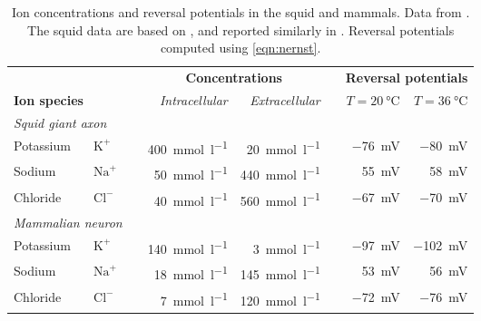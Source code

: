 \begin{table}
	\centering
	\caption[Ion concentrations and reversal potentials in the squid and mammals]{Ion concentrations and reversal potentials in the squid and mammals. Data from \citet[Table~12.1, p.~353]{mccormick2014membrane}. The squid data are based on \citet{hodgkin1949effect}, and reported similarly in \citet[Table~6-1, p.~128]{kandel2012principles}. Reversal potentials computed using \cref{eqn:nernst}.}
	\label{tbl:nernst}
	\small
	\sffamily
	\begin{tabular}{l l p{0.25cm} r r p{0.25cm} r r}
		\toprule
		&
		&
		& \multicolumn{2}{c}{\textbf{Concentrations}}
		&
		& \multicolumn{2}{c}{\textbf{Reversal potentials}} \\ %
		\cmidrule(lr){4-5}\cmidrule(lr){7-8}
		
		\multicolumn{2}{l}{\textbf{Ion species}}
		&
		& \emph{Intracellular}
		& \emph{Extracellular}
		&
		& $T = \SI{20}{\degreeCelsius}$
		& $T = \SI{36}{\degreeCelsius}$ \\ %
		\midrule

		\multicolumn{2}{l}{\emph{Squid giant axon}}\\

		\raggedleft \quad Potassium
		& $\mathrm{K}^+$
		&
		& \SI{400}{\milli\mol\per\litre}
		& \SI{20}{\milli\mol\per\litre}
		&
		& \SI{-76}{\milli\volt}
		& \SI{-80}{\milli\volt} \\

		\raggedleft \quad Sodium
		& $\mathrm{Na}^+$
		&
		& \SI{50}{\milli\mol\per\litre}
		& \SI{440}{\milli\mol\per\litre}
		&
		& \SI{55}{\milli\volt}
		& \SI{58}{\milli\volt} \\

		\raggedleft \quad Chloride
		& $\mathrm{Cl}^-$
		&
		& \SI{40}{\milli\mol\per\litre}
		& \SI{560}{\milli\mol\per\litre}
		&
		& \SI{-67}{\milli\volt}
		& \SI{-70}{\milli\volt} \\[0.25cm]

		\multicolumn{2}{l}{\emph{Mammalian neuron}}\\

		\raggedleft \quad Potassium
		& $\mathrm{K}^+$
		&
		& \SI{140}{\milli\mol\per\litre}
		& \SI{3}{\milli\mol\per\litre}
		&
		& \SI{-97}{\milli\volt}
		& \SI{-102}{\milli\volt} \\

		\raggedleft \quad Sodium
		& $\mathrm{Na}^+$
		&
		& \SI{18}{\milli\mol\per\litre}
		& \SI{145}{\milli\mol\per\litre}
		&
		& \SI{53}{\milli\volt}
		& \SI{56}{\milli\volt} \\

		\raggedleft \quad Chloride
		& $\mathrm{Cl}^-$
		&
		& \SI{7}{\milli\mol\per\litre}
		& \SI{120}{\milli\mol\per\litre}
		&
		& \SI{-72}{\milli\volt}
		& \SI{-76}{\milli\volt} \\

		\bottomrule
	\end{tabular}
\end{table}

